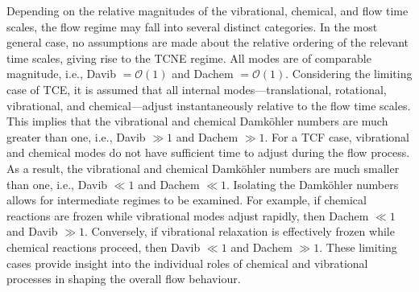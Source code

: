 Depending on the relative magnitudes of the vibrational, chemical, and flow time scales, the flow regime may fall into several distinct categories. In the most general case, no assumptions are made about the relative ordering of the relevant time scales, giving rise to the \gls{TCNE} regime. All modes are of comparable magnitude, i.e., \gls{Davib} $= \mathcal{O}(1)$ and \gls{Dachem} $= \mathcal{O}(1)$. Considering the limiting case of \gls{TCE}, it is assumed that all internal modes—translational, rotational, vibrational, and chemical—adjust instantaneously relative to the flow time scales. This implies that the vibrational and chemical Damköhler numbers are much greater than one, i.e., \gls{Davib} $\gg 1$ and \gls{Dachem} $\gg 1$. For a \gls{TCF} case, vibrational and chemical modes do not have sufficient time to adjust during the flow process. As a result, the vibrational and chemical Damköhler numbers are much smaller than one, i.e., \gls{Davib} $\ll 1$ and \gls{Dachem} $\ll 1$. Isolating the Damköhler numbers allows for intermediate regimes to be examined. For example, if chemical reactions are frozen while vibrational modes adjust rapidly, then \gls{Dachem} $\ll 1$ and \gls{Davib} $\gg 1$. Conversely, if vibrational relaxation is effectively frozen while chemical reactions proceed, then \gls{Davib} $\ll 1$ and \gls{Dachem} $\gg 1$. These limiting cases provide insight into the individual roles of chemical and vibrational processes in shaping the overall flow behaviour.




